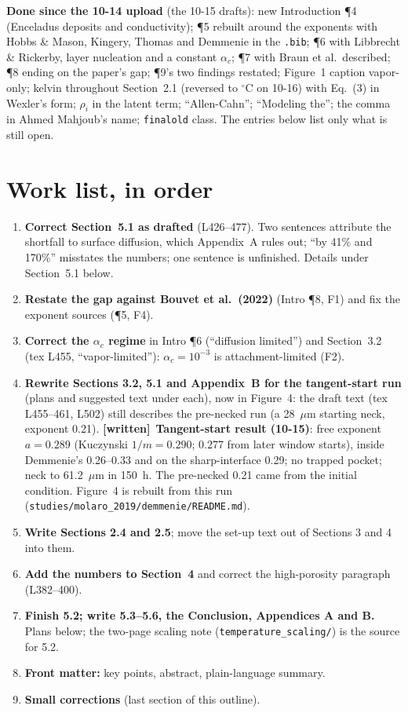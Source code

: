 \documentclass[11pt]{article}
\newcommand{\Have}{\textcolor{have}{\textbf{[written]}}\ }
\begin{document}
\textbf{Done since the 10-14 upload} (the 10-15 drafts): new Introduction
\P4 (Enceladus deposits and conductivity); \P5 rebuilt around the exponents
with Hobbs \& Mason, Kingery, Thomas and Demmenie in the \texttt{.bib}; \P6
with Libbrecht \& Rickerby, layer nucleation and a constant $\alpha_c$; \P7
with Braun et al.\ described; \P8 ending on the paper's gap; \P9's two findings
restated; Figure~1 caption vapor-only; kelvin throughout Section~2.1 (reversed to $^\circ$C on 10-16) with
Eq.~(3) in Wexler's form; $\rho_i$ in the latent term; ``Allen-Cahn'';
``Modeling the''; the comma in Ahmed Mahjoub's name; \texttt{finalold}
class. The entries below list only what is still open.

\section*{Work list, in order}
\begin{enumerate}
\item \textbf{Correct Section~5.1 as drafted} (L426--477). Two sentences
  attribute the shortfall to surface diffusion, which Appendix~A rules out;
  ``by 41\% and 170\%'' misstates the numbers; one sentence is unfinished.
  Details under Section~5.1 below.
\item \textbf{Restate the gap against Bouvet et al.\ (2022)} (Intro \P8, F1)
  and fix the exponent sources (\P5, F4).
\item \textbf{Correct the $\alpha_c$ regime} in Intro \P6 (``diffusion
  limited'') and Section~3.2 (tex L455, ``vapor-limited''): $\alpha_c =
  10^{-3}$ is attachment-limited (F2).
\item \textbf{Rewrite Sections 3.2, 5.1 and Appendix~B for the tangent-start
  run} (plans and suggested text under each), now in Figure~4: the draft text (tex L455--461, L502) still describes
  the pre-necked run (a 28~$\mu$m starting neck, exponent 0.21). \Have \textbf{Tangent-start result (10-15)}: free exponent $a = 0.289$
(Kuczynski $1/m = 0.290$; 0.277 from later window starts), inside Demmenie's
0.26--0.33 and on the sharp-interface 0.29; no trapped pocket; neck to
61.2~$\mu$m in 150~h. The pre-necked 0.21 came from the initial condition.
Figure~4 is rebuilt from this run (\texttt{studies/molaro\_2019/demmenie/README.md}).
\item \textbf{Write Sections 2.4 and 2.5}; move the set-up text out of
  Sections 3 and 4 into them.
\item \textbf{Add the numbers to Section~4} and correct the high-porosity
  paragraph (L382--400).
\item \textbf{Finish 5.2; write 5.3--5.6, the Conclusion, Appendices A and
  B.} Plans below; the two-page scaling note
  (\texttt{temperature\_scaling/}) is the source for 5.2.
\item \textbf{Front matter:} key points, abstract, plain-language summary.
\item \textbf{Small corrections} (last section of this outline).
\end{enumerate}
\end{document}
